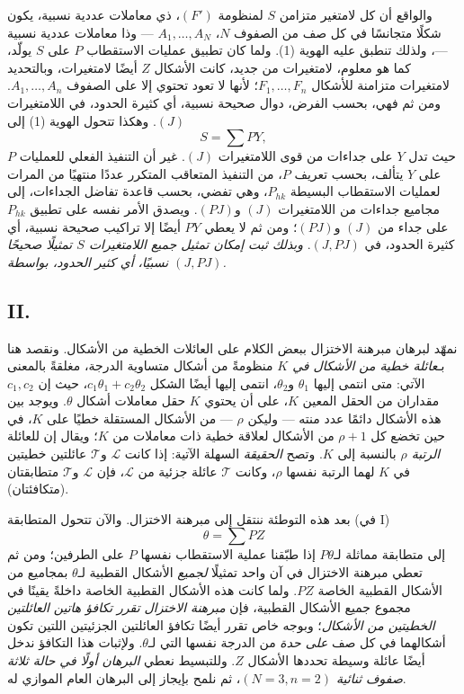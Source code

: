 \documentclass[11pt]{article}
\begin{document}
والواقع أن كل لامتغير متزامن $S$ لمنظومة $(F')$، ذي معاملات عددية نسبية، يكون شكلًا متجانسًا في كل صف من الصفوف $N$، $A_1,\ldots,A_N$ --- وذا معاملات عددية نسبية ---، ولذلك تنطبق عليه الهوية (1). ولما كان تطبيق عمليات الاستقطاب $P$ على $S$ يولّد، كما هو معلوم، لامتغيرات من جديد، كانت الأشكال $Z$ أيضًا لامتغيرات، وبالتحديد لامتغيرات متزامنة للأشكال $F_1,
\ldots,F_n$؛ لأنها لا تعود تحتوي إلا على الصفوف $A_1,
\ldots,A_n$. ومن ثم فهي، بحسب الفرض، دوال صحيحة نسبية، أي كثيرة الحدود، في اللامتغيرات $(J)$. وهكذا تتحول الهوية (1) إلى
\[
  S=\sum PY,
\]
حيث تدل $Y$ على جداءات من قوى اللامتغيرات $(J)$. غير أن التنفيذ الفعلي للعمليات $P$ على $Y$ يتألف، بحسب تعريف $P$، من التنفيذ المتعاقب المتكرر عددًا منتهيًا من المرات لعمليات الاستقطاب البسيطة $P_{hk}$، وهي تفضي، بحسب قاعدة تفاضل الجداءات، إلى مجاميع جداءات من اللامتغيرات $(J)$ و$(PJ)$. ويصدق الأمر نفسه على تطبيق $P_{hk}$ على جداء من $(J)$ و$(PJ)$؛ ومن ثم لا يعطي $PY$ أيضًا إلا تراكيب صحيحة نسبية، أي كثيرة الحدود، في $(J,PJ)$. \emph{وبذلك ثبت إمكان تمثيل جميع اللامتغيرات $S$ تمثيلًا صحيحًا نسبيًا، أي كثير الحدود، بواسطة $(J,PJ)$.}

\subsection*{II.}
نمهّد لبرهان مبرهنة الاختزال ببعض الكلام على العائلات الخطية من الأشكال. ونقصد هنا بـ\emph{عائلة خطية من الأشكال في $K$} منظومةً من أشكال متساوية الدرجة، مغلقةً بالمعنى الآتي: متى انتمى إليها $\theta_1$ و$\theta_2$، انتمى إليها أيضًا الشكل $c_1\theta_1+c_2\theta_2$، حيث إن $c_1,c_2$ مقداران من الحقل المعين $K$، على أن يحتوي $K$ حقل معاملات أشكال $\theta$. ويوجد بين هذه الأشكال دائمًا عدد منته --- وليكن $\rho$ --- من الأشكال المستقلة خطيًا على $K$، في حين تخضع كل $\rho+1$ من الأشكال لعلاقة خطية ذات معاملات من $K$؛ ويقال إن للعائلة \emph{الرتبة $\rho$} بالنسبة إلى $K$. وتصح \emph{الحقيقة} السهلة الآتية: إذا كانت $\mathcal L$ و$\mathcal T$ عائلتين خطيتين في $K$ لهما الرتبة نفسها $\rho$، وكانت $\mathcal T$ عائلة جزئية من $\mathcal L$، فإن $\mathcal L$ و$\mathcal T$ متطابقتان (متكافئتان).

بعد هذه التوطئة ننتقل إلى مبرهنة الاختزال. والآن تتحول المتطابقة (في I)
\[
  \theta=\sum PZ
\]
إلى متطابقة مماثلة لـ$P\theta$ إذا طبّقنا عملية الاستقطاب نفسها $P$ على الطرفين؛ ومن ثم تعطي مبرهنة الاختزال في آن واحد تمثيلًا \emph{لجميع} الأشكال القطبية لـ$\theta$ بمجاميع من الأشكال القطبية الخاصة $PZ$. ولما كانت هذه الأشكال القطبية الخاصة داخلةً يقينًا في مجموع جميع الأشكال القطبية، فإن \emph{مبرهنة الاختزال تقرر تكافؤ هاتين العائلتين الخطيتين من الأشكال}؛ وبوجه خاص تقرر أيضًا تكافؤ العائلتين الجزئيتين اللتين تكون أشكالهما في كل صف \emph{على حدة} من الدرجة نفسها التي لـ$\theta$. ولإثبات هذا التكافؤ ندخل أيضًا عائلة وسيطة تحددها الأشكال $Z$. وللتبسيط نعطي \emph{البرهان أولًا في حالة ثلاثة صفوف ثنائية $(N=3,n=2)$}، ثم نلمح بإيجاز إلى البرهان العام الموازي له.
\end{document}
